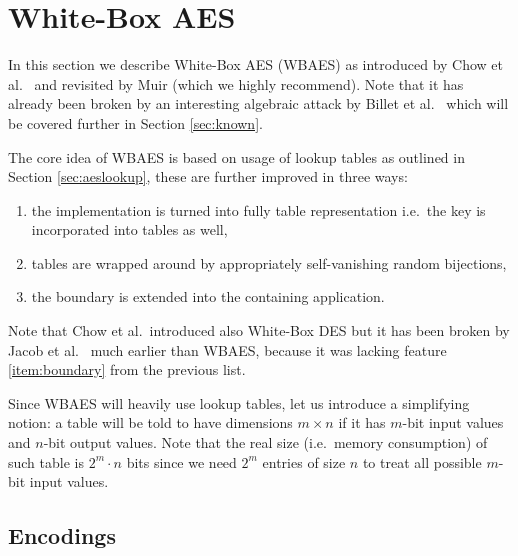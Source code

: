\section{White-Box AES}
\label{sec:wbaes}

In this section we describe White-Box AES (WBAES) as introduced by Chow et al.\ \cite{chow2002aes} and revisited by Muir \cite{muir2013tutorial} (which we highly recommend). Note that it has already been broken by an interesting algebraic attack by Billet et al.\ \cite{billet2004cryptanalysis} which will be covered further in Section \ref{sec:known}.

The core idea of WBAES is based on usage of lookup tables as outlined in Section \ref{sec:aeslookup}, these are further improved in three ways:
\begin{enumerate}
	\item the implementation is turned into fully table representation i.e.\ the key is incorporated into tables as well,
	\item tables are wrapped around by appropriately self-vanishing random bijections, \label{item:wrap}
	\item the boundary is extended into the containing application. \label{item:boundary}
\end{enumerate}
Note that Chow et al.\ introduced also White-Box DES \cite{chow2002des} but it has been broken by Jacob et al.\ \cite{jacob2002attacking} much earlier than WBAES, because it was lacking feature \ref{item:boundary} from the previous list.

\begin{notion}
\label{notion:table}
	Since WBAES will heavily use lookup tables, let us introduce a simplifying notion: a table will be told to have dimensions $m\times n$ if it has $m$-bit input values and $n$-bit output values. Note that the real size (i.e.\ memory consumption) of such table is $2^m\cdot n$ bits since we need $2^m$ entries of size $n$ to treat all possible $m$-bit input values.
\end{notion}



\subsection{Encodings}
\label{sec:encod}

